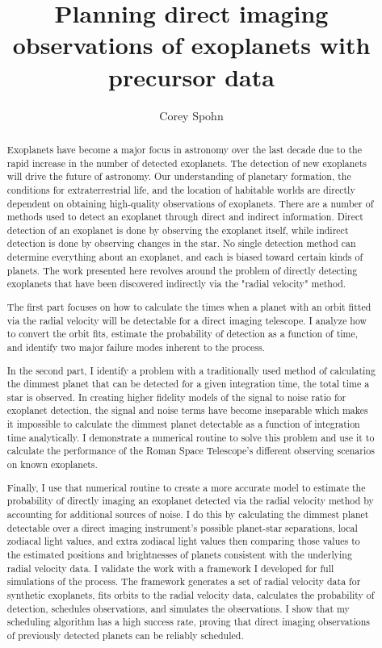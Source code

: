\documentclass[phd,tocprelim]{cornell}
\title {Planning direct imaging observations of exoplanets with precursor data}
\author {Corey Spohn}
\begin{document}
\maketitle
\makecopyright

\begin{abstract}
Exoplanets have become a major focus in astronomy over the last decade due to
the rapid increase in the number of detected exoplanets. The detection of new
exoplanets will drive the future of astronomy. Our understanding of planetary
formation, the conditions for extraterrestrial life, and the location of
habitable worlds are directly dependent on obtaining high-quality observations
of exoplanets. There are a number of methods used to detect an exoplanet
through direct and indirect information. Direct detection of an exoplanet is
done by observing the exoplanet itself, while indirect detection is done by
observing changes in the star. No single detection method can determine
everything about an exoplanet, and each is biased toward certain kinds of
planets. The work presented here revolves around the problem of directly
detecting exoplanets that have been discovered indirectly 
via the "radial velocity" method.

The first part focuses on how to calculate the times when a planet with an
orbit fitted via the radial velocity will be detectable for a direct imaging
telescope. I analyze how to convert the orbit fits, estimate the probability of
detection as a function of time, and identify two major failure modes inherent
to the process.

In the second part, I identify a problem with a traditionally used method of
calculating the dimmest planet that can be detected for a given integration
time, the total time a star is observed. In creating higher fidelity models of
the signal to noise ratio for exoplanet detection, the signal and noise terms
have become inseparable which makes it impossible to calculate the dimmest
planet detectable as a function of integration time analytically. I demonstrate
a numerical routine to solve this problem and use it to calculate the
performance of the Roman Space Telescope's different observing scenarios on
known exoplanets.

Finally, I use that numerical routine to create a more accurate model to
estimate the probability of directly imaging an exoplanet detected via the
radial velocity method by accounting for additional sources of noise. I do this
by calculating the dimmest planet detectable over a direct imaging instrument's
possible planet-star separations, local zodiacal light values, and extra zodiacal
light values then comparing those values to the estimated positions and
brightnesses of planets consistent with the underlying radial velocity data. I
validate the work with a framework I developed for full simulations of the
process. The framework generates a set of radial velocity data for synthetic
exoplanets, fits orbits to the radial velocity data, calculates the probability
of detection, schedules observations, and simulates the observations. I show
that my scheduling algorithm has a high success rate, proving that direct
imaging observations of previously detected planets can be reliably scheduled.



\end{abstract}
\end{document}
